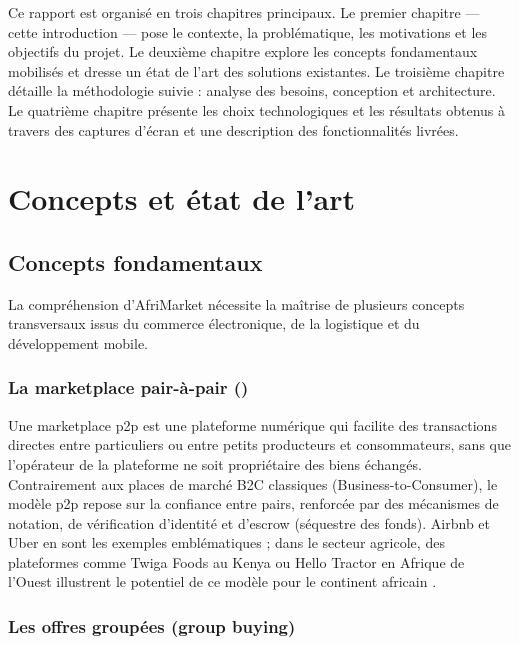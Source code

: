 \documentclass[12pt, a4paper, oneside]{report}
\begin{document}
Ce rapport est organisé en trois chapitres principaux. Le premier chapitre — cette
introduction — pose le contexte, la problématique, les motivations et les objectifs du
projet. Le deuxième chapitre explore les concepts fondamentaux mobilisés et dresse un
état de l'art des solutions existantes. Le troisième chapitre détaille la méthodologie
suivie : analyse des besoins, conception et architecture. Le quatrième chapitre présente
les choix technologiques et les résultats obtenus à travers des captures d'écran et une
description des fonctionnalités livrées.

\chapter{Concepts et état de l'art}

\section{Concepts fondamentaux}

La compréhension d'AfriMarket nécessite la maîtrise de plusieurs concepts transversaux
issus du commerce électronique, de la logistique et du développement mobile.

\subsection{La marketplace pair-à-pair ()}

Une marketplace \gls{p2p} est une plateforme numérique qui facilite des transactions
directes entre particuliers ou entre petits producteurs et consommateurs, sans que
l'opérateur de la plateforme ne soit propriétaire des biens échangés. Contrairement aux
places de marché B2C classiques (Business-to-Consumer), le modèle \gls{p2p} repose sur la
confiance entre pairs, renforcée par des mécanismes de notation, de vérification d'identité
et d'escrow (séquestre des fonds). Airbnb et Uber en sont les exemples emblématiques ;
dans le secteur agricole, des plateformes comme Twiga Foods au Kenya ou Hello Tractor en
Afrique de l'Ouest illustrent le potentiel de ce modèle pour le continent africain
\cite{twiga2023}.

\subsection{Les offres groupées (group buying)}
\end{document}
